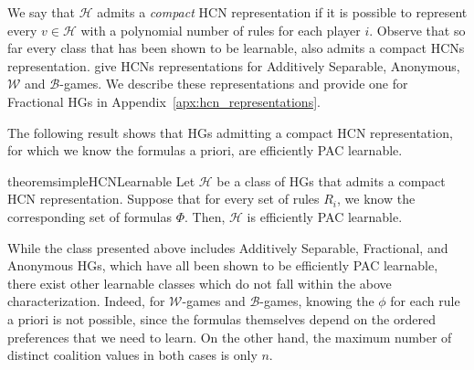 \documentclass[letterpaper]{article} %
\newcommand{\hclass}{\ensuremath{\mathcal{H}}}
\newcommand{\W}{\ensuremath{\mathcal{W}}}
\begin{document}
We say that $\hclass$ admits a \emph{compact} HCN representation if it is possible to represent every $v \in \hclass$ with a polynomial number of rules for each player $i$.
Observe that so far every class that has been shown to be learnable, also admits a compact HCNs representation. \citet{Elkind09} give HCNs representations for Additively Separable, Anonymous, $\W$ and $\mathcal{B}$-games.
We describe these representations and provide one for Fractional HGs in Appendix~\ref{apx:hcn_representations}.

The following result shows that HGs admitting a compact HCN representation, for which we know the formulas a priori, are efficiently PAC learnable.

\begin{restatable}{theorem}{simpleHCNLearnable}\label{thm:simple_hcn_learnable}
Let $\hclass$ be a class of HGs that admits a compact HCN representation. Suppose that for every set of rules $R_i$, we know the corresponding set of formulas $\Phi$. Then, $\hclass$ is efficiently PAC learnable.
\end{restatable}
While the class presented above includes Additively Separable, Fractional, and Anonymous HGs, which have all been shown to be efficiently PAC learnable, there exist other learnable classes which do not fall within the above characterization.
Indeed, for $\W$-games and $\mathcal{B}$-games, knowing the $\phi$ for each rule a priori is not possible, since the formulas themselves depend on the ordered preferences that we need to learn. On the other hand, the maximum number of distinct coalition values in both cases is only $n$.
\end{document}
